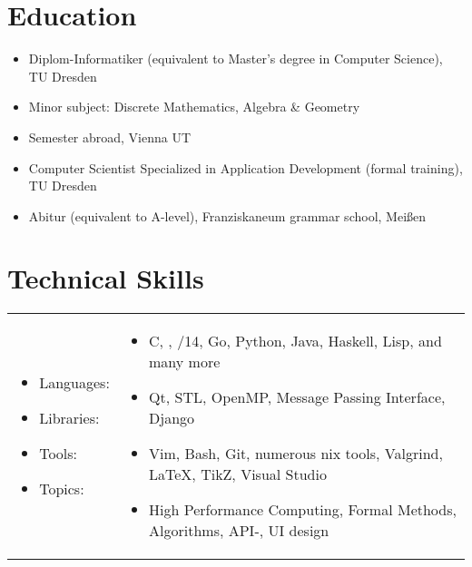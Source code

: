 \customhrule
\section*{Education}
\begin{itemize}
	\item {}
		Diplom-Informatiker (equivalent to Master's degree in Computer Science), TU Dresden
	\item \hspace{1em} Minor subject: Discrete Mathematics, Algebra \& Geometry
	\item {}
		Semester abroad, Vienna UT
	\item {}
		Computer Scientist Specialized in Application Development (formal training), TU Dresden
	\item {}
		Abitur (equivalent to A-level), Franziskaneum grammar school, Mei\ss en %
\end{itemize}

\customhrule
\section*{Technical Skills}
\vspace{0.1cm} %
\begin{tabular}{l l}
	\begin{minipage}{0.18\textwidth}
		\begin{itemize}
			\item Languages:
			\item Libraries:
			\item Tools:
			\item Topics:
		\end{itemize}
	\end{minipage}
	&
	\begin{minipage}{0.80\textwidth}
		\begin{itemize}
			\item C, \cpp, \cpp11/14, Go, Python, Java, Haskell, Lisp, and many more
			\item Qt, STL, OpenMP, Message Passing Interface, Django
			\item Vim, Bash, Git, numerous \textasteriskcentered{}nix tools, Valgrind, \LaTeX, TikZ, Visual Studio
			\item High Performance Computing, Formal Methods, Algorithms, API-, UI design
		\end{itemize}
	\end{minipage}
\end{tabular}

